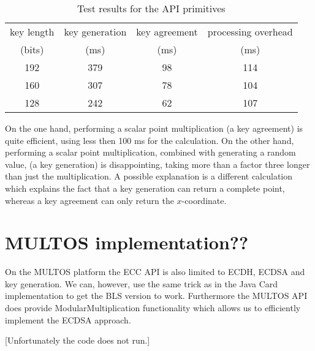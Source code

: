 \begin{table}
  \centering
  \caption{Test results for the API primitives}\label{tab:primitives}
  \renewcommand{\tabcolsep}{1.25mm}
  \renewcommand{\arraystretch}{1.25}
  \begin{tabular}{| c || c | c | c |}\hline
    key length & key generation & key agreement & processing overhead \\
    (bits) & (ms) & (ms) & (ms) \\\hline
    \hline
    192 & 379 & 98 & 114 \\\hline
    160 & 307 & 78 & 104 \\\hline
    128 & 242 & 62 & 107 \\\hline
  \end{tabular}
\end{table}

On the one hand, performing a scalar point multiplication (a key agreement) is
quite efficient, using less then 100 ms for the calculation. On the other hand,
performing a scalar point multiplication, combined with generating a random
value, (a key generation) is disappointing, taking more than a factor three
longer than just the multiplication. A possible explanation is a different
calculation which explains the fact that a key generation can return a complete
point, whereas a key agreement can only return the $x$-coordinate.

\section{MULTOS implementation??}

On the MULTOS platform the ECC API is also limited to ECDH, ECDSA and key generation.
We can, however, use the same trick as in the Java Card implementation to get the
BLS version to work. Furthermore the MULTOS API does provide ModularMultiplication
functionality which allows us to efficiently implement the ECDSA approach.

[Unfortunately the code does not run.]